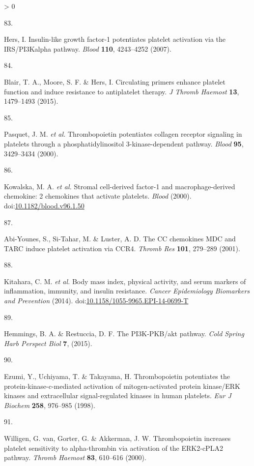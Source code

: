 \documentclass[11pt,twoside]{bristolthesis}
\newlength{\cslhangindent}
\newlength{\csllabelwidth}
\newenvironment{CSLReferences}[2] %
 {%
  \setlength{\parindent}{0pt}
  \ifodd #1 \everypar{\setlength{\hangindent}{\cslhangindent}}\ignorespaces\fi
  \ifnum #2 > 0
  \setlength{\parskip}{#2\baselineskip}
  \fi
 }%
 {}
\newcommand{\CSLLeftMargin}[1]{\parbox[t]{\csllabelwidth}{#1}}
\newcommand{\CSLRightInline}[1]{\parbox[t]{\linewidth - \csllabelwidth}{#1}\break}
\begin{document}
\begin{CSLReferences}{0}{0}
\leavevmode\hypertarget{ref-Hers2007}{}%
\CSLLeftMargin{83. }
\CSLRightInline{Hers, I. Insulin-like growth factor-1 potentiates platelet activation via the IRS/PI3Kalpha pathway. \emph{Blood} \textbf{110}, 4243--4252 (2007).}

\leavevmode\hypertarget{ref-Blair2015}{}%
\CSLLeftMargin{84. }
\CSLRightInline{Blair, T. A., Moore, S. F. \& Hers, I. Circulating primers enhance platelet function and induce resistance to antiplatelet therapy. \emph{J Thromb Haemost} \textbf{13}, 1479--1493 (2015).}

\leavevmode\hypertarget{ref-Pasquet2000}{}%
\CSLLeftMargin{85. }
\CSLRightInline{Pasquet, J. M. \emph{et al.} Thrombopoietin potentiates collagen receptor signaling in platelets through a phosphatidylinositol 3-kinase-dependent pathway. \emph{Blood} \textbf{95}, 3429--3434 (2000).}

\leavevmode\hypertarget{ref-Kowalska2000}{}%
\CSLLeftMargin{86. }
\CSLRightInline{Kowalska, M. A. \emph{et al.} Stromal cell-derived factor-1 and macrophage-derived chemokine: 2 chemokines that activate platelets. \emph{Blood} (2000). doi:\href{https://doi.org/10.1182/blood.v96.1.50}{10.1182/blood.v96.1.50}}

\leavevmode\hypertarget{ref-Abi-Younes2001}{}%
\CSLLeftMargin{87. }
\CSLRightInline{Abi-Younes, S., Si-Tahar, M. \& Luster, A. D. The CC chemokines MDC and TARC induce platelet activation via CCR4. \emph{Thromb Res} \textbf{101}, 279--289 (2001).}

\leavevmode\hypertarget{ref-Kitahara2014}{}%
\CSLLeftMargin{88. }
\CSLRightInline{Kitahara, C. M. \emph{et al.} Body mass index, physical activity, and serum markers of inflammation, immunity, and insulin resistance. \emph{Cancer Epidemiology Biomarkers and Prevention} (2014). doi:\href{https://doi.org/10.1158/1055-9965.EPI-14-0699-T}{10.1158/1055-9965.EPI-14-0699-T}}

\leavevmode\hypertarget{ref-Hemmings2015}{}%
\CSLLeftMargin{89. }
\CSLRightInline{Hemmings, B. A. \& Restuccia, D. F. The PI3K-PKB/akt pathway. \emph{Cold Spring Harb Perspect Biol} \textbf{7}, (2015).}

\leavevmode\hypertarget{ref-Ezumi1998}{}%
\CSLLeftMargin{90. }
\CSLRightInline{Ezumi, Y., Uchiyama, T. \& Takayama, H. Thrombopoietin potentiates the protein-kinase-c-mediated activation of mitogen-activated protein kinase/ERK kinases and extracellular signal-regulated kinases in human platelets. \emph{Eur J Biochem} \textbf{258}, 976--985 (1998).}

\leavevmode\hypertarget{ref-VanWilligen2000}{}%
\CSLLeftMargin{91. }
\CSLRightInline{Willigen, G. van, Gorter, G. \& Akkerman, J. W. Thrombopoietin increases platelet sensitivity to alpha-thrombin via activation of the ERK2-cPLA2 pathway. \emph{Thromb Haemost} \textbf{83}, 610--616 (2000).}


\end{CSLReferences}
\end{document}
